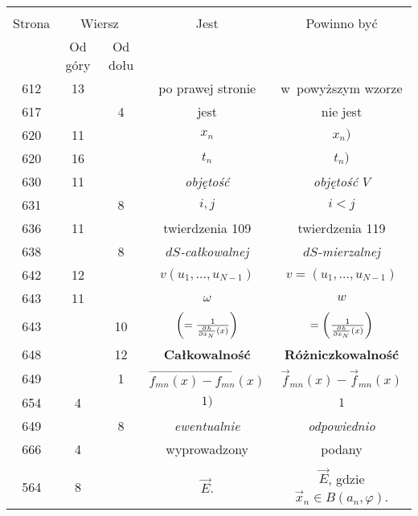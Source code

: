 \documentclass[a4paper,11pt]{article}
\begin{document}
\begin{center}

  \begin{tabular}{|c|c|c|c|c|}
    \hline
    & \multicolumn{2}{c|}{} & & \\
    Strona & \multicolumn{2}{c|}{Wiersz} & Jest
                              & Powinno być \\ \cline{2-3}
    & Od góry & Od dołu & & \\
    \hline
    612 & 13 & & po prawej stronie & w~powyższym wzorze \\
    617 & &  4 & jest & nie jest \\
    620 & 11 & & $x_{ n }$ & $x_{ n } )$ \\
    620 & 16 & & $t_{ n }$ & $t_{ n } )$ \\
    630 & 11 & & \emph{objętość} & \emph{objętość $V$} \\
    631 & &  8 & $i, j$ & $i < j$ \\
    636 & 11 & & twierdzenia 109 & twierdzenia 119 \\
    638 & &  8 & \emph{$dS$-całkowalnej}
           & \emph{$dS$-mierzalnej} \\
    642 & 12 & & $v( u_{ 1 }, \ldots, u_{ N - 1 } )$
           & $v = ( u_{ 1 }, \ldots, u_{ N - 1 } )$ \\
    643 & 11 & & $\omega$ & $w$ \\
    643 & & 10 & $\left( = \frac{ 1 }{
                 \frac{ \partial^{  } {  h  } }{ \partial {  { x_{ N } }  }^{  } }( x ) } \right)$
           & $= \left( \frac{ 1 }{
             \frac{ \partial^{  } {  h  } }{ \partial {  { x_{ N } }  }^{  } }( x ) } \right)$ \\
    648 & & 12 & \textbf{Całkowalność}
           & \textbf{Różniczkowalność} \\
    649 & &  1 & $\overrightarrow{ f_{ m n }( x ) - f_{ m n }( x ) }$
           & $\vec{ f }_{ m n }( x ) - \vec{ f }_{ m n }( x )$ \\
    654 &  4 & & $1 )$ & $1$ \\
    649 & &  8 & \textit{ewentualnie} & \textit{odpowiednio} \\
    666 &  4 & & wyprowadzony & podany \\
    & & & & \\
    564 &  8 & & $\vec{ E }$.
           & $\vec{ E }$, gdzie $\vec{ x }_{ n } \in B( a_{ n }, \varphi )$. \\
    \hline
  \end{tabular}

\end{center}
\end{document}
